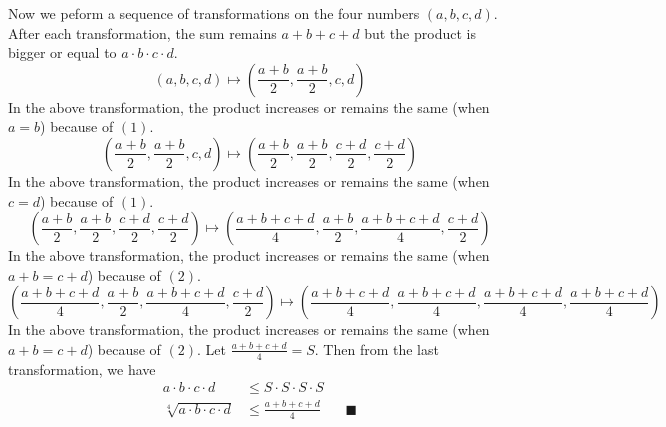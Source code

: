 \documentclass{article}
\begin{document}
Now we peform a sequence of transformations on the four numbers $(a, b, c, d)$. After each transformation, the sum remains $a+b+c+d$ but the product is bigger or equal to $a \cdot b \cdot c \cdot d$.
\[
	{(a, b, c, d) \mapsto \left(\frac{a+b}{2}, \frac{a+b}{2}, c, d \right)}
\]
In the above transformation, the product increases or remains the same (when $a = b$) because of $(1)$.
\[
	\left(\frac{a+b}{2}, \frac{a+b}{2}, c, d \right) \mapsto \left(\frac{a+b}{2}, \frac{a+b}{2}, \frac{c+d}{2}, \frac{c+d}{2} \right)
\]
In the above transformation, the product increases or remains the same (when $c = d$) because of $(1)$.
\[
	\left(\frac{a+b}{2}, \frac{a+b}{2}, \frac{c+d}{2}, \frac{c+d}{2} \right) \mapsto \left(\frac{a+b+c+d}{4}, \frac{a+b}{2}, \frac{a+b+c+d}{4}, \frac{c+d}{2} \right)
\]
In the above transformation, the product increases or remains the same (when $a+b = c+d$) because of $(2)$.
\[
	\left(\frac{a+b+c+d}{4}, \frac{a+b}{2}, \frac{a+b+c+d}{4}, \frac{c+d}{2} \right) \mapsto \left(\frac{a+b+c+d}{4}, \frac{a+b+c+d}{4}, \frac{a+b+c+d}{4}, \frac{a+b+c+d}{4} \right)
\]
In the above transformation, the product increases or remains the same (when $a+b = c+d$) because of $(2)$.
Let $\frac{a+b+c+d}{4} = S$. Then from the last transformation, we have
\begin{equation*}
	\begin{aligned}
		a \cdot b \cdot c \cdot d &\leq S \cdot S \cdot S \cdot S\\
		\sqrt[4]{a \cdot b \cdot c \cdot d} &\leq \frac{a+b+c+d}{4}\ \ \ \ \ \ \ \ \blacksquare
	\end{aligned}
\end{equation*}
\end{document}
